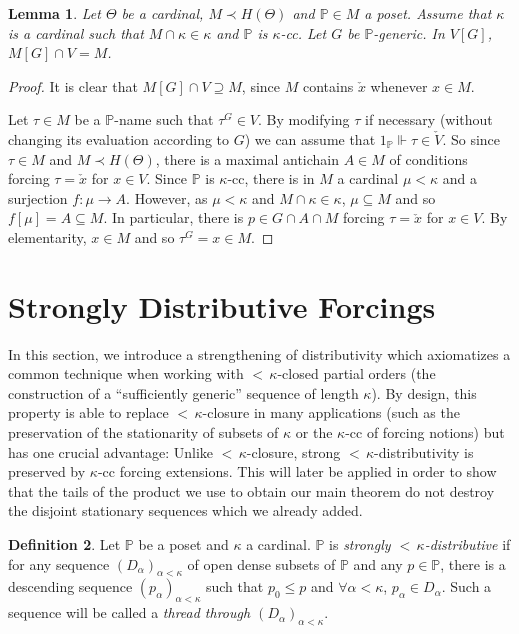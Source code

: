 \documentclass[12pt]{amsart}
\theoremstyle{definition}
\newtheorem{mydef}{Definition}[section]
\theoremstyle{remark}
\theoremstyle{plain}
\newtheorem{mylem}[mydef]{Lemma}
\numberwithin{mydef}{section}
\newcommand{\dP}{\mathbb{P}}
\begin{document}
	\begin{mylem}
		Let $\Theta$ be a cardinal, $M\prec H(\Theta)$ and $\dP\in M$ a poset. Assume that $\kappa$ is a cardinal such that $M\cap\kappa\in\kappa$ and $\dP$ is $\kappa$-cc. Let $G$ be $\dP$-generic. In $V[G]$, $M[G]\cap V=M$.
	\end{mylem}
	
	\begin{proof}
		It is clear that $M[G]\cap V\supseteq M$, since $M$ contains $\check{x}$ whenever $x\in M$.
		
		Let $\tau\in M$ be a $\dP$-name such that $\tau^G\in V$. By modifying $\tau$ if necessary (without changing its evaluation according to $G$) we can assume that $1_{\dP}\Vdash\tau\in\check{V}$. So since $\tau\in M$ and $M\prec H(\Theta)$, there is a maximal antichain $A\in M$ of conditions forcing $\tau=\check{x}$ for $x\in V$. Since $\dP$ is $\kappa$-cc, there is in $M$ a cardinal $\mu<\kappa$ and a surjection $f\colon\mu\to A$. However, as $\mu<\kappa$ and $M\cap\kappa\in\kappa$, $\mu\subseteq M$ and so $f[\mu]=A\subseteq M$. In particular, there is $p\in G\cap A\cap M$ forcing $\tau=\check{x}$ for $x\in V$. By elementarity, $x\in M$ and so $\tau^G=x\in M$.
	\end{proof}
	
	\section{Strongly Distributive Forcings}
	
	In this section, we introduce a strengthening of distributivity which axiomatizes a common technique when working with ${<}\,\kappa$-closed partial orders (the construction of a ``sufficiently generic'' sequence of length $\kappa$). By design, this property is able to replace ${<}\,\kappa$-closure in many applications (such as the preservation of the stationarity of subsets of $\kappa$ or the $\kappa$-cc of forcing notions) but has one crucial advantage: Unlike ${<}\,\kappa$-closure, strong ${<}\,\kappa$-distributivity is preserved by $\kappa$-cc forcing extensions. This will later be applied in order to show that the tails of the product we use to obtain our main theorem do not destroy the disjoint stationary sequences which we already added.
	
	\begin{mydef}
		Let $\dP$ be a poset and $\kappa$ a cardinal. $\dP$ is \emph{strongly ${<}\,\kappa$-distributive} if for any sequence $(D_{\alpha})_{\alpha<\kappa}$ of open dense subsets of $\dP$ and any $p\in\dP$, there is a descending sequence $(p_{\alpha})_{\alpha<\kappa}$ such that $p_0\leq p$ and $\forall\alpha<\kappa$, $p_{\alpha}\in D_{\alpha}$. Such a sequence will be called a \emph{thread through $(D_{\alpha})_{\alpha<\kappa}$}.
	\end{mydef}
	
\end{document}
